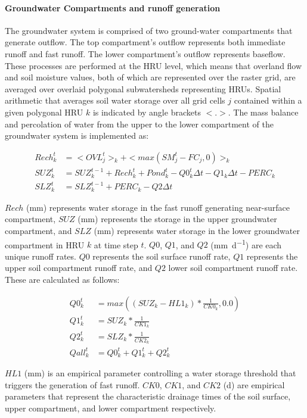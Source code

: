 \paragraph{Groundwater Compartments and runoff generation}
The groundwater system is comprised of two ground-water compartments that generate outflow. The top compartment's outflow represents both immediate runoff and fast runoff. The lower compartment's outflow represents baseflow. These processes are performed at the HRU level, which means that overland flow and soil moisture values, both of which are represented over the raster grid, are averaged over overlaid polygonal subwatersheds representing HRUs. Spatial arithmetic that averages soil water storage over all grid cells $j$ contained within a given polygonal HRU $k$ is indicated by angle brackets $<.>$. The mass balance and percolation of water from the upper to the lower compartment of the groundwater system is implemented as:

\begin{align}
Rech_k^t &= <OVL_j^t>_k + <max(SM_j^t - FC_j, 0)>_k\\
SUZ_k^t &= SUZ_k^{t-1} + Rech_k^t + Pond_k^t - Q0_k^t\Delta t - Q1_k\Delta t - PERC_k\\
SLZ_k^t &= SLZ_k^{t-1} + PERC_k - Q2 \Delta t
\end{align}

\noindent $Rech$ (\si{\milli\meter}) represents water storage in the fast runoff generating near-surface compartment, $SUZ$ (\si{\milli\meter}) represents the storage in the upper groundwater compartment, and $SLZ$ (\si{\milli\meter}) represents water storage in the lower groundwater compartment in HRU $k$ at time step $t$. $Q0$, $Q1$, and $Q2$ (\si{\milli\meter\per\day}) are each unique runoff rates. $Q0$ represents the soil surface runoff rate, $Q1$ represents the upper soil compartment runoff rate, and $Q2$ lower soil compartment runoff rate. These are calculated as follows:

\begin{align}
Q0_k^t &= max((SUZ_k - HL1_k) * \frac{1}{CK0_k}, 0.0)\\
Q1_k^t &= SUZ_k * \frac{1}{CK1_k}\\
Q2_k^t &= SLZ_k * \frac{1}{CK2_k}\\
Qall_k^t &= Q0_k^t + Q1_k^t + Q2_k^t
\end{align}

\noindent $HL1$ (\si{\milli\meter}) is an empirical parameter controlling a water storage threshold that triggers the generation of fast runoff. $CK0$, $CK1$, and $CK2$ (\si{\day}) are empirical parameters that represent the characteristic drainage times of the soil surface, upper compartment, and lower compartment respectively.

